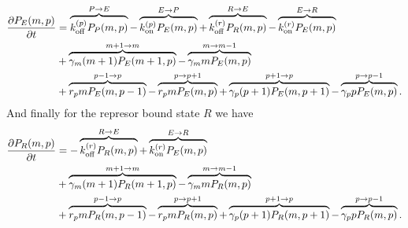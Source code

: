 \begin{equation}
  \begin{aligned}
    \dt{P_E(m, p)} &=
    \overbrace{\kpoff P_P(m, p)}^{P \rightarrow E} %
    - \overbrace{\kpon P_E(m, p)}^{E \rightarrow P} %
    + \overbrace{\kroff P_R(m, p)}^{R \rightarrow E} %
    - \overbrace{\kron P_E(m, p)}^{E \rightarrow R}\\ %
    &+ \overbrace{\gm (m + 1) P_E(m+1 , p)}^{m+1 \rightarrow m} %
    - \overbrace{\gm m P_E(m , p)}^{m \rightarrow m-1}\\ %
    &+ \overbrace{r_p m P_E(m, p - 1)}^{p-1 \rightarrow p} %
    - \overbrace{r_p m P_E(m, p)}^{p \rightarrow p+1} %
    + \overbrace{\gp (p + 1) P_E(m, p + 1)}^{p + 1 \rightarrow p} %
    - \overbrace{\gp p P_E(m, p)}^{p \rightarrow p-1}. %
  \end{aligned}
\end{equation}
And finally for the represor bound state $R$ we have
\begin{equation}
  \begin{aligned}
    \dt{P_R(m, p)} &=
    - \overbrace{\kroff P_R(m, p)}^{R \rightarrow E} %
    + \overbrace{\kron P_E(m, p)}^{E \rightarrow R}\\ %
    &+ \overbrace{\gm (m + 1) P_R(m+1 , p)}^{m+1 \rightarrow m} %
    - \overbrace{\gm m P_R(m , p)}^{m \rightarrow m-1}\\ %
    &+ \overbrace{r_p m P_R(m, p - 1)}^{p-1 \rightarrow p} %
    - \overbrace{r_p m P_R(m, p)}^{p \rightarrow p+1} %
    + \overbrace{\gp (p + 1) P_R(m, p + 1)}^{p + 1 \rightarrow p} %
    - \overbrace{\gp p P_R(m, p)}^{p \rightarrow p-1}. %
  \end{aligned}
\end{equation}


